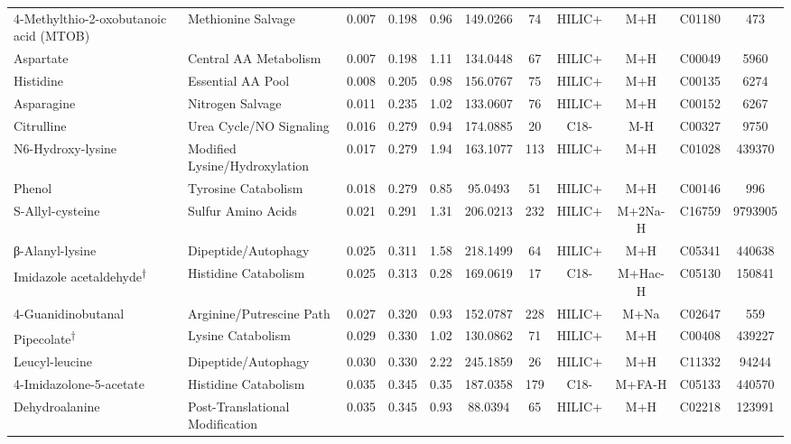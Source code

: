 \begin{longtable}[t]{llccccccccc}
\hspace*{0.3cm}4-Methylthio-2-oxobutanoic acid (MTOB) & Methionine Salvage & 0.007 & 0.198 & 0.96 & 149.0266 & 74 & HILIC+ & M+H & C01180 & 473\\
\hspace*{0.3cm}Aspartate & Central AA Metabolism & 0.007 & 0.198 & 1.11 & 134.0448 & 67 & HILIC+ & M+H & C00049 & 5960\\
\hspace*{0.3cm}Histidine & Essential AA Pool & 0.008 & 0.205 & 0.98 & 156.0767 & 75 & HILIC+ & M+H & C00135 & 6274\\
\hspace*{0.3cm}Asparagine & Nitrogen Salvage & 0.011 & 0.235 & 1.02 & 133.0607 & 76 & HILIC+ & M+H & C00152 & 6267\\
\hspace*{0.3cm}Citrulline & Urea Cycle/NO Signaling & 0.016 & 0.279 & 0.94 & 174.0885 & 20 & C18- & M-H & C00327 & 9750\\

\hspace*{0.3cm}N6-Hydroxy-lysine & Modified Lysine/Hydroxylation & 0.017 & 0.279 & 1.94 & 163.1077 & 113 & HILIC+ & M+H & C01028 & 439370\\
\hspace*{0.3cm}Phenol & Tyrosine Catabolism & 0.018 & 0.279 & 0.85 & 95.0493 & 51 & HILIC+ & M+H & C00146 & 996\\
\hspace*{0.3cm}S-Allyl-cysteine & Sulfur Amino Acids & 0.021 & 0.291 & 1.31 & 206.0213 & 232 & HILIC+ & M+2Na-H & C16759 & 9793905\\
\hspace*{0.3cm}β-Alanyl-lysine & Dipeptide/Autophagy & 0.025 & 0.311 & 1.58 & 218.1499 & 64 & HILIC+ & M+H & C05341 & 440638\\
\hspace*{0.3cm}Imidazole acetaldehyde\textsuperscript{†} & Histidine Catabolism & 0.025 & 0.313 & 0.28 & 169.0619 & 17 & C18- & M+Hac-H & C05130 & 150841\\

\hspace*{0.3cm}4-Guanidinobutanal & Arginine/Putrescine Path & 0.027 & 0.320 & 0.93 & 152.0787 & 228 & HILIC+ & M+Na & C02647 & 559\\
\hspace*{0.3cm}Pipecolate\textsuperscript{†} & Lysine Catabolism & 0.029 & 0.330 & 1.02 & 130.0862 & 71 & HILIC+ & M+H & C00408 & 439227\\
\hspace*{0.3cm}Leucyl-leucine & Dipeptide/Autophagy & 0.030 & 0.330 & 2.22 & 245.1859 & 26 & HILIC+ & M+H & C11332 & 94244\\
\hspace*{0.3cm}4-Imidazolone-5-acetate & Histidine Catabolism & 0.035 & 0.345 & 0.35 & 187.0358 & 179 & C18- & M+FA-H & C05133 & 440570\\
\hspace*{0.3cm}Dehydroalanine & Post-Translational Modification & 0.035 & 0.345 & 0.93 & 88.0394 & 65 & HILIC+ & M+H & C02218 & 123991\\


\end{longtable}
